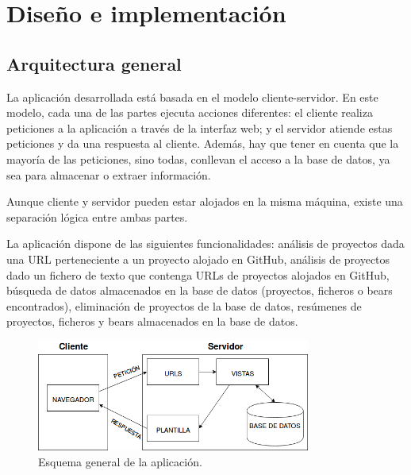 \documentclass[a4paper, 12pt]{book}
\begin{document}

\cleardoublepage
\chapter{Diseño e implementación}

\section{Arquitectura general} 
\label{sec:seccion11}
La aplicación desarrollada está basada en el modelo cliente-servidor. En este modelo, cada una de las partes ejecuta acciones diferentes: el cliente realiza peticiones a la aplicación a través de la interfaz web; y el servidor atiende estas peticiones y da una respuesta al cliente. Además, hay que tener en cuenta que la mayoría de las peticiones, sino todas, conllevan el acceso a la base de datos, ya sea para almacenar o extraer información.

Aunque cliente y servidor pueden estar alojados en la misma máquina, existe una separación lógica entre ambas partes.

La aplicación dispone de las siguientes funcionalidades: análisis de proyectos dada una URL perteneciente a un proyecto alojado en GitHub, análisis de proyectos dado un fichero de texto que contenga URLs de proyectos alojados en GitHub, búsqueda de datos almacenados en la base de datos (proyectos, ficheros o bears encontrados), eliminación de proyectos de la base de datos, resúmenes de proyectos, ficheros y bears almacenados en la base de datos.

\begin{figure}[H]
  \centering
  \includegraphics[width=9cm, keepaspectratio]{img/arqSistema}
  \caption{Esquema general de la aplicación.}
  \label{fig:arqSistema}
\end{figure}
\end{document}
